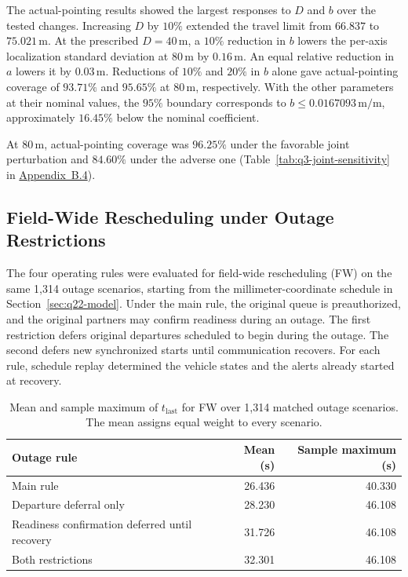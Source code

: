 \documentclass{swmcmthesis}
\begin{document}
The actual-pointing results showed the largest responses to \(D\) and \(b\) over the tested changes. Increasing \(D\) by \(10\%\) extended the travel limit from \(66.837\) to \(75.021\,\mathrm m\). At the prescribed \(D=40\,\mathrm m\), a \(10\%\) reduction in \(b\) lowers the per-axis localization standard deviation at \(80\,\mathrm m\) by \(0.16\,\mathrm m\). An equal relative reduction in \(a\) lowers it by \(0.03\,\mathrm m\). Reductions of \(10\%\) and \(20\%\) in \(b\) alone gave actual-pointing coverage of \(93.71\%\) and \(95.65\%\) at \(80\,\mathrm m\), respectively. With the other parameters at their nominal values, the \(95\%\) boundary corresponds to \(b\leq 0.0167093\,\mathrm{m/m}\), approximately \(16.45\%\) below the nominal coefficient.

At \(80\,\mathrm m\), actual-pointing coverage was \(96.25\%\) under the favorable joint perturbation and \(84.60\%\) under the adverse one (Table~\ref{tab:q3-joint-sensitivity} in \hyperref[app:q3-alternatives]{Appendix~B.4}).

\subsection{Field-Wide Rescheduling under Outage Restrictions}
\label{sec:q4-outage-sensitivity}

The four operating rules were evaluated for field-wide rescheduling (FW) on the same 1,314 outage scenarios, starting from the millimeter-coordinate schedule in Section~\ref{sec:q22-model}. Under the main rule, the original queue is preauthorized, and the original partners may confirm readiness during an outage. The first restriction defers original departures scheduled to begin during the outage. The second defers new synchronized starts until communication recovers. For each rule, schedule replay determined the vehicle states and the alerts already started at recovery.

\begin{table}[!htbp]
    \centering
    \caption{Mean and sample maximum of \(t_{\mathrm{last}}\) for FW over 1,314 matched outage scenarios. The mean assigns equal weight to every scenario.}
    \label{tab:q4-outage-sensitivity}
    \begin{tabular}{@{}lrr@{}}
        \toprule
        Outage rule & Mean (s) & Sample maximum (s) \\
        \midrule
        Main rule & 26.436 & 40.330 \\
        Departure deferral only & 28.230 & 46.108 \\
        Readiness confirmation deferred until recovery & 31.726 & 46.108 \\
        Both restrictions & 32.301 & 46.108 \\
        \bottomrule
    \end{tabular}
\end{table}
\end{document}
